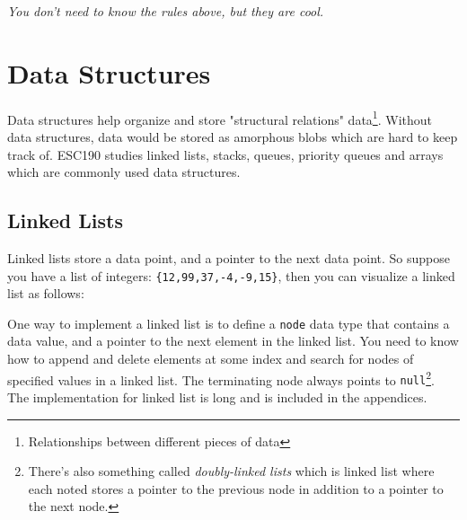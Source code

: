 \documentclass{tufte-handout}
\newcommand{\code}[1]{\colorbox{light-gray}{\texttt{#1}}}
\begin{document}
\textit{You don't need to know the rules above, but they are cool.}

\section{Data Structures}
Data structures help organize and store "structural relations" data\footnote{Relationships between different pieces of data}. Without data structures, data would be stored as amorphous blobs which are hard to keep track of. ESC190 studies linked lists, stacks, queues, priority queues and arrays which are commonly used data structures.
\subsection{Linked Lists}
Linked lists store a data point, and a pointer to the next data point. So suppose you have a list of integers: \code{\{12,99,37,-4,-9,15\}}, then you can visualize a linked list as follows:


One way to implement a linked list is to define a \code{node} data
type that contains a data value, and a pointer to the next element in
the linked list. You need to know how to append and delete elements at
some index and search for nodes of specified values in a linked
list. The terminating node always points to
\code{null}\footnote{There's also something called
  \textit{doubly-linked lists} which is linked list where each noted
  stores a pointer to the previous node in addition to a pointer to
  the next node.}. The implementation for linked list is long and is
included in the appendices.
\end{document}
